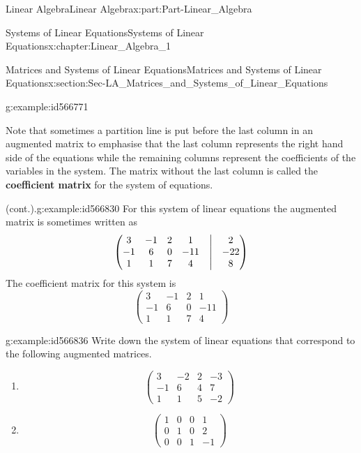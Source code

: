 \documentclass[oneside,10pt,]{book}
\newcommand{\terminology}[1]{\textbf{#1}}
\numberwithin{equation}{section}
\newcommand{\amp}{&}
\begin{document}
\begin{partptx}{Linear Algebra}{}{Linear Algebra}{}{}{x:part:Part-Linear_Algebra}
\begin{chapterptx}{Systems of Linear Equations}{}{Systems of Linear Equations}{}{}{x:chapter:Linear_Algebra_1}
\begin{sectionptx}{Matrices and Systems of Linear Equations}{}{Matrices and Systems of Linear Equations}{}{}{x:section:Sec-LA_Matrices_and_Systems_of_Linear_Equations}
\begin{example}{}{g:example:id566771}
\begin{equation*}
\end{equation*}
%
\end{example}
Note that sometimes a partition line is put before the last column in an augmented matrix to emphasise that the last column represents the right hand side of the equations while the remaining columns represent the coefficients of the variables in the system. The matrix without the last column is called the \terminology{coefficient matrix} for the system of equations.%
\begin{example}{(cont.).}{g:example:id566830}%
For this system of linear equations the augmented matrix is sometimes written as%
\begin{equation*}
\begin{pmatrix} 3 \amp -1 \amp 2 \amp 1 \amp \bigm| \amp 2 \\ -1 \amp 6 \amp 0 \amp -11 \amp \bigm| \amp -22 \\ 1 \amp 1 \amp 7 \amp 4 \amp \bigm| \amp 8 \end{pmatrix}
\end{equation*}
The coefficient matrix for this system is%
\begin{equation*}
\begin{pmatrix} 3 \amp -1 \amp 2 \amp 1 \\ -1 \amp 6 \amp 0 \amp -11 \\ 1 \amp 1 \amp 7 \amp 4 \end{pmatrix}
\end{equation*}
%
\end{example}
\begin{example}{}{g:example:id566836}%
Write down the system of linear equations that correspond to the following augmented matrices.%
\par
%
\begin{enumerate}[label=(\alph*).]
\item{}%
\begin{equation*}
\begin{pmatrix} 3 \amp -2 \amp 2 \amp -3 \\ -1 \amp 6 \amp 4 \amp 7 \\ 1 \amp 1 \amp 5 \amp -2 \end{pmatrix} 
\end{equation*}
%
\item{}%
\begin{equation*}
\begin{pmatrix} 1 \amp 0 \amp 0 \amp 1 \\ 0 \amp 1 \amp 0 \amp 2 \\ 0 \amp 0 \amp 1 \amp -1 \end{pmatrix} 

\end{equation*}
\end{enumerate}
\end{example}
\end{sectionptx}
\end{chapterptx}
\end{partptx}
\end{document}
